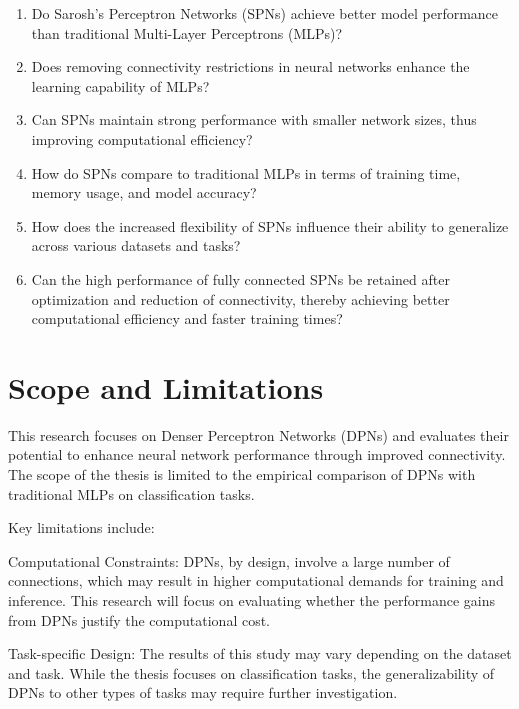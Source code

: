 \begin{enumerate}[label={RQ\arabic*.}, leftmargin=*]
    \item Do Sarosh's Perceptron Networks (SPNs) achieve better model performance than traditional Multi-Layer Perceptrons (MLPs)? \label{RQ1}
    \item Does removing connectivity restrictions in neural networks enhance the learning capability of MLPs? \label{RQ2}
    \item Can SPNs maintain strong performance with smaller network sizes, thus improving computational efficiency? \label{RQ3}
    \item How do SPNs compare to traditional MLPs in terms of training time, memory usage, and model accuracy? \label{RQ4}
    \item How does the increased flexibility of SPNs influence their ability to generalize across various datasets and tasks? \label{RQ5}
    \item Can the high performance of fully connected SPNs be retained after optimization and reduction of connectivity, thereby achieving better computational efficiency and faster training times? \label{RQ6}
\end{enumerate}


\section{Scope and Limitations}

This research focuses on Denser Perceptron Networks (DPNs) and evaluates their potential to enhance neural network performance through improved connectivity. The scope of the thesis is limited to the empirical comparison of DPNs with traditional MLPs on classification tasks.

Key limitations include:

Computational Constraints: DPNs, by design, involve a large number of connections, which may result in higher computational demands for training and inference. This research will focus on evaluating whether the performance gains from DPNs justify the computational cost.

Task-specific Design: The results of this study may vary depending on the dataset and task. While the thesis focuses on classification tasks, the generalizability of DPNs to other types of tasks may require further investigation.

